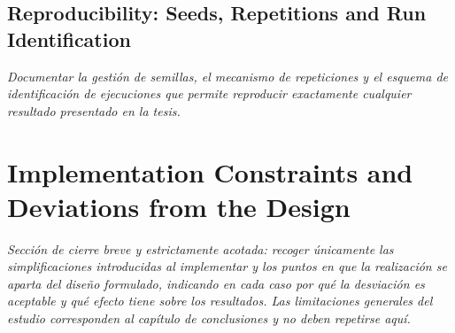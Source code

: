 \subsection{Reproducibility: Seeds, Repetitions and Run Identification}
\emph{Documentar la gestión de semillas, el mecanismo de repeticiones y el
esquema de identificación de ejecuciones que permite reproducir exactamente
cualquier resultado presentado en la tesis.}

\section{Implementation Constraints and Deviations from the Design}
\emph{Sección de cierre breve y estrictamente acotada: recoger únicamente las
simplificaciones introducidas al implementar y los puntos en que la realización
se aparta del diseño formulado, indicando en cada caso por qué la desviación es
aceptable y qué efecto tiene sobre los resultados. Las limitaciones generales del
estudio corresponden al capítulo de conclusiones y no deben repetirse aquí.}
